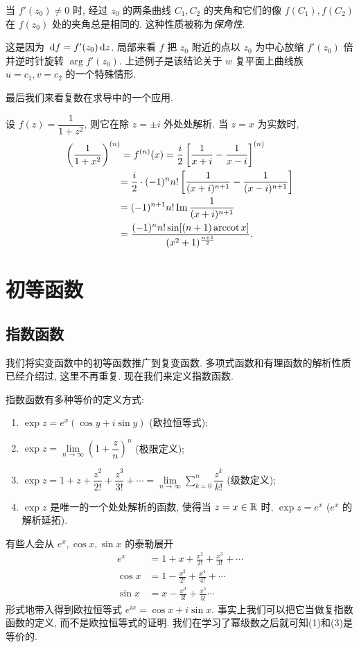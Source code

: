 \documentclass[nocolor,theme=doremi,lang=cn,11pt,chinese,twoside,openright,usesamecnt]{elegantbook}
\newcommand\enumnum[1]{{\mdseries\upshape\textcolor[rgb]{.2,.2,.7}{(#1)}}}
\begin{document}
当 $f'(z_0)\neq 0$ 时, 
经过 $z_0$ 的两条曲线 $C_1,C_2$ 的夹角和它们的像 $f(C_1),f(C_2)$ 在 $f(z_0)$ 处的夹角总是相同的.
这种性质被称为\emph{保角性}.

这是因为 $\,\mathrm{d} f=f'(z_0)\,\mathrm{d} z$.
局部来看 $f$ 把 $z_0$ 附近的点以 $z_0$ 为中心放缩 $f'(z_0)$ 倍并逆时针旋转 $\arg{f'(z_0)}$.
上述例子是该结论关于 $w$ 复平面上曲线族 $u=c_1,v=c_2$ 的一个特殊情形.

最后我们来看复数在求导中的一个应用.

\begin{example}
	设 $f(z)=\dfrac1{1+z^2}$, 则它在除 $z=\pm i$ 外处处解析.
	{当 $z=x$ 为实数时,
		\begin{align*}
		\left(\dfrac1{1+x^2}\right)^{(n)}&=f^{(n)}(x)=\frac i2\left[\frac1{x+i}-\frac1{x-i}\right]^{(n)}\\
		&{=\frac i2\cdot(-1)^n n!\left[\frac1{(x+i)^{n+1}}-\frac1{(x-i)^{n+1}}\right]}\\
		&{=(-1)^{n+1}n!\operatorname{Im}\frac1{(x+i)^{n+1}}}\\
		&{=\frac{(-1)^nn!\sin[(n+1)\operatorname{arccot} x]}{(x^2+1)^{\frac{n+1}2}}.}
		\end{align*}}
\end{example}

\section{初等函数}

\subsection{指数函数}

我们将实变函数中的初等函数推广到复变函数.
多项式函数和有理函数的解析性质已经介绍过, 这里不再重复.
现在我们来定义指数函数.

指数函数有多种等价的定义方式:
\begin{enumerate}
	\item $\exp z=e^x(\cos y+i\sin y)$ (欧拉恒等式);
	\item $\exp z=\lim\limits_{n\to\infty}\left(1+\dfrac zn\right)^n$ (极限定义);
	\item $\exp z=1+z+\dfrac{z^2}{2!}+\dfrac{z^3}{3!}+\cdots
	=\lim\limits_{n\to\infty}\sum\limits_{k=0}^n\dfrac{z^k}{k!}$ (级数定义);
	\item $\exp z$ 是唯一的一个处处解析的函数, 使得当 $z=x\in{\mathbb{R}}$ 时, $\exp z=e^x$ ($e^x$ 的解析延拓).
\end{enumerate}

有些人会从 $e^x,\cos x,\sin x$ 的泰勒展开
\begin{align*}
	e^x&=1+x+\frac{x^2}{2!}+\frac{x^3}{3!}+\cdots\\
	\cos x&=1-\frac{x^2}{2!}+\frac{x^4}{4!}+\cdots\\
	\sin x&=x-\frac{x^3}{3!}+\frac{x^5}{5!}\cdots
\end{align*}
形式地带入得到欧拉恒等式 $e^{ix}=\cos x+i\sin x$.
事实上我们可以把它当做复指数函数的定义, 而不是欧拉恒等式的证明.
我们在学习了幂级数之后就可知\enumnum1和\enumnum3是等价的.
\end{document}
